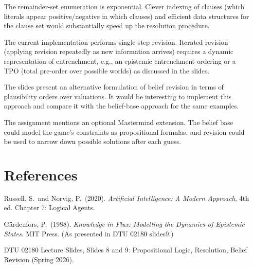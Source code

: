 \documentclass[11pt,a4paper]{article}
\begin{document}
\begin{description}[noitemsep]
  \item[Efficiency] The remainder-set enumeration is exponential.
        Clever indexing of clauses (which literals appear positive/negative
        in which clauses) and efficient data structures for the clause set
        would substantially speed up the resolution procedure.

  \item[Iterated revision] The current implementation performs single-step
        revision.  Iterated revision (applying revision repeatedly as new
        information arrives) requires a dynamic representation of entrenchment,
        e.g., an epistemic entrenchment ordering or a TPO (total pre-order over
        possible worlds) as discussed in the slides.

  \item[Plausibility-order approach] The slides present an alternative
        formulation of belief revision in terms of plausibility orders over
        valuations.  It would be interesting to implement this approach and
        compare it with the belief-base approach for the same examples.

  \item[Mastermind extension] The assignment mentions an optional Mastermind
        extension.  The belief base could model the game's constraints as
        propositional formulas, and revision could be used to narrow down
        possible solutions after each guess.
\end{description}

\section*{References}

\begin{enumerate}[label={[\arabic*]},noitemsep]
  \item Russell, S.\ and Norvig, P.\ (2020).
        \textit{Artificial Intelligence: A Modern Approach}, 4th ed.
        Chapter 7: Logical Agents.
  \item Gärdenfors, P.\ (1988).
        \textit{Knowledge in Flux: Modelling the Dynamics of Epistemic States}.
        MIT Press.  (As presented in DTU 02180 slides9.)
  \item DTU 02180 Lecture Slides, Slides 8 and 9:
        Propositional Logic, Resolution, Belief Revision (Spring 2026).
\end{enumerate}
\end{document}

